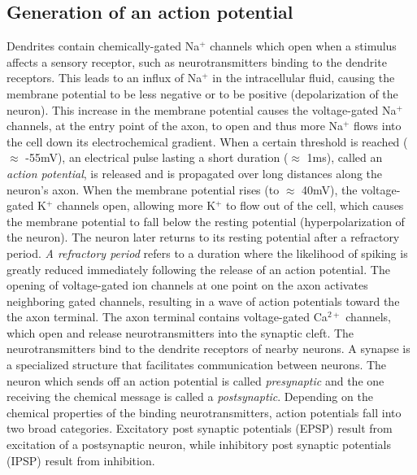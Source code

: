 \subsection{Generation of an action potential}
Dendrites contain chemically-gated Na$^{+}$ channels which open when 
a stimulus affects a sensory receptor, such as neurotransmitters binding to the dendrite receptors. This leads to an influx of Na$^{+}$ in the intracellular fluid, causing the membrane potential to be less negative or to be positive (depolarization of the neuron). 
This increase in the membrane potential causes the voltage-gated Na$^{+}$ channels, at the entry point of the axon, to open and thus more Na$^{+}$ flows into the cell down its electrochemical  gradient. When a certain threshold is reached ($\approx$ -55mV), an electrical pulse lasting  a short duration ($\approx$ 1ms),  called an \textit{action potential}, is released and is propagated over long distances along the neuron's axon. When the membrane potential rises (to  $\approx$ 40mV), the voltage-gated K$^{+}$ channels open, allowing more K$^{+}$ to flow out of the cell, which causes
the membrane potential to fall below the resting potential (hyperpolarization of the neuron). The neuron later returns to its resting potential after a refractory period.
\textit{A refractory period} refers to a duration where the likelihood of spiking is greatly reduced immediately following the release of an action potential.
The opening of voltage-gated ion channels at one point on the axon
activates neighboring gated channels, resulting in a wave of action potentials toward the the axon terminal. The axon terminal contains voltage-gated Ca$^{2+}$ channels, which open and release neurotransmitters into the synaptic cleft. The neurotransmitters bind to the dendrite receptors of nearby neurons.
A synapse is a specialized structure that facilitates communication between neurons. The neuron which sends off an action potential is called \textit{presynaptic} and the one receiving the 
chemical message is called a \textit{postsynaptic}.
Depending on the chemical properties of the binding neurotransmitters, action potentials fall into two broad categories. Excitatory post synaptic potentials (EPSP) result from excitation of a postsynaptic neuron, while inhibitory post synaptic potentials (IPSP) result from inhibition.

